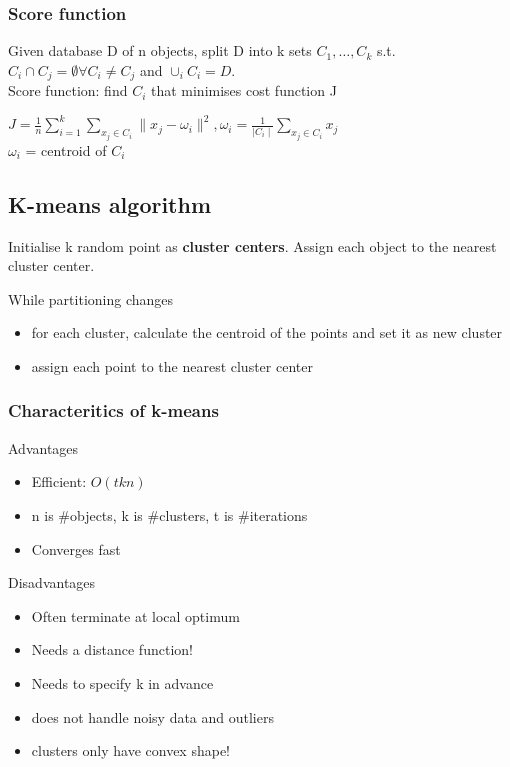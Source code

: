 \subsubsection{Score function}

Given database D of n objects, split D into k sets $ C_1, \ldots, C_k
$ s.t.\ $ C_i \cap C_j = \emptyset \forall C_i \neq C_j $ and $ \cup_i
C_i = D $. \\

Score function: find $ C_i $ that minimises cost function J

$ J = \frac{1}{n} \sum_{i=1}^k \sum_{x_j \in C_i} \|x_j - \omega_i
\|^2, \omega_i = \frac{1}{\mid C_i \mid} \sum_{x_j \in C_i} x_j $ \\

$ \omega_i $ = centroid of $ C_i $

\subsection{K-means algorithm}
Initialise k random point as \textbf{cluster centers}.
Assign each object to the nearest cluster center.

While partitioning changes
\begin{itemize}
\item for each cluster, calculate the centroid of the points and set
  it as new cluster
\item assign each point to the nearest cluster center
\end{itemize}

\subsubsection{Characteritics of k-means}
Advantages
\begin{itemize}
\item Efficient: $ O(tkn) $
\item n is \#objects, k is \#clusters, t is \#iterations
\item Converges fast
\end{itemize}
Disadvantages
\begin{itemize}
\item Often terminate at local optimum
\item Needs a distance function!
\item Needs to specify k in advance
\item does not handle noisy data and outliers
\item clusters only have convex shape!
\end{itemize}

